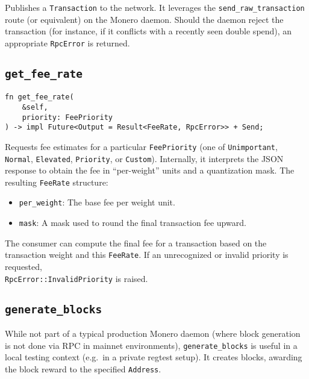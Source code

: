 \documentclass[12pt,a4paper]{article}
\begin{document}
Publishes a \texttt{Transaction} to the network.  It leverages the
\texttt{send\_raw\_transaction} route (or equivalent) on the Monero daemon.
Should the daemon reject the transaction (for instance, if it conflicts with a
recently seen double spend), an appropriate \texttt{RpcError} is returned.

\subsection{\texttt{get\_fee\_rate}}
\label{sec:monero-rpc-rpc-trait-fee-estimate}

\begin{verbatim}
fn get_fee_rate(
    &self,
    priority: FeePriority
) -> impl Future<Output = Result<FeeRate, RpcError>> + Send;
\end{verbatim}

Requests fee estimates for a particular \texttt{FeePriority} (one of
\texttt{Unimportant}, \texttt{Normal}, \texttt{Elevated}, \texttt{Priority}, or
\texttt{Custom}).  Internally, it interprets the JSON response to obtain the fee
in “per-weight” units and a quantization mask.  The resulting \texttt{FeeRate}
structure:

\begin{itemize}
    \item \texttt{per\_weight}: The base fee per weight unit.
    \item \texttt{mask}: A mask used to round the final transaction fee upward.
\end{itemize}

The consumer can compute the final fee for a transaction based on the
transaction weight and this \texttt{FeeRate}.  If an unrecognized or invalid
priority is requested,\\ \texttt{RpcError::InvalidPriority} is raised.

\subsection{\texttt{generate\_blocks}}
\label{sec:monero-rpc-rpc-trait-generate-blocks}

While not part of a typical production Monero daemon (where block generation is
not done via RPC in mainnet environments), \texttt{generate\_blocks} is useful
in a local testing context (e.g.\ in a private regtest setup).  It creates
blocks, awarding the block reward to the specified \texttt{Address}.
\end{document}
